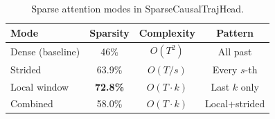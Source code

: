 \documentclass[10pt,twocolumn]{article}
\newcommand{\best}[1]{\textbf{\color{mygreen}#1}}
\begin{document}
\begin{table}[h]
\centering
\caption{Sparse attention modes in SparseCausalTrajHead.}
\scriptsize
\begin{tabular}{@{}lccc@{}}
\toprule
\textbf{Mode} & \textbf{Sparsity} & \textbf{Complexity} &
\textbf{Pattern} \\
\midrule
Dense (baseline) & 46\% & $O(T^2)$ & All past \\
Strided & 63.9\% & $O(T/s)$ & Every $s$-th \\
Local window & \best{72.8\%} & $O(T{\cdot}k)$ & Last $k$ only \\
Combined & 58.0\% & $O(T{\cdot}k)$ & Local+strided \\
\bottomrule
\end{tabular}
\end{table}
\end{document}
